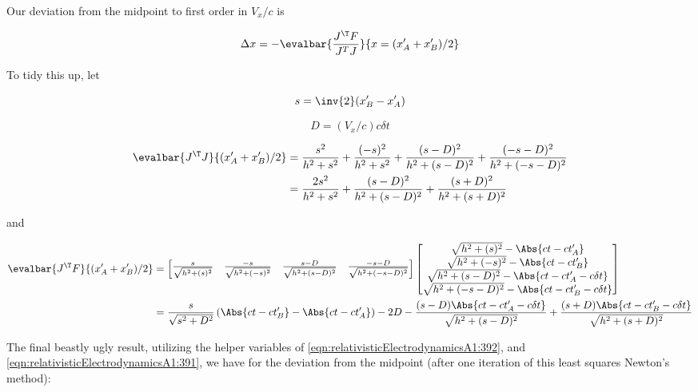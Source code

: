 Our deviation from the midpoint to first order in $V_x/c$ is

\begin{equation}\label{eqn:relativisticElectrodynamicsA1:390}
\Delta x = - \evalbar{ \frac{J^\T F}{J^T J} }{x = (x_A' + x_B')/2}
\end{equation}

To tidy this up, let

\begin{equation}\label{eqn:relativisticElectrodynamicsA1:391}
s = \inv{2} (x_B' - x_A')
\end{equation}

\begin{equation}\label{eqn:relativisticElectrodynamicsA1:392}
D = (V_x/c) c \delta t
\end{equation}

\begin{align*}
\evalbar{J^\T J}{(x_A' + x_B')/2} 
&= 
\frac{s^2}{h^2 + s^2}
+\frac{(-s)^2}{h^2 + s^2}
+\frac{(s - D)^2}{h^2 + (s -D)^2}
+\frac{(-s - D)^2}{h^2 + (-s -D)^2} \\
&= 
\frac{2 s^2}{h^2 + s^2}
+\frac{(s - D)^2}{h^2 + (s -D)^2}
+\frac{(s + D)^2}{h^2 + (s +D)^2}
\end{align*}

and

\begin{align*}
\evalbar{J^\T F}{(x_A' + x_B')/2} 
&=
\begin{bmatrix}
\frac{s}{\sqrt{ h^2 + (s)^2 } } &
\frac{-s}{\sqrt{ h^2 + (-s)^2 } } &
\frac{s - D}{\sqrt{ h^2 + (s - D)^2 } } &
\frac{-s - D}{\sqrt{ h^2 + (-s - D)^2 } } 
\end{bmatrix}
\begin{bmatrix}
\sqrt{ h^2 + (s)^2 } - \Abs{c t - c t_A'} \\
\sqrt{ h^2 + (-s)^2 } - \Abs{c t - c t_B'} \\
\sqrt{ h^2 + (s - D)^2 } - \Abs{c t - c t_A' - c \delta t} \\
\sqrt{ h^2 + (-s - D)^2 } - \Abs{c t - c t_B' - c \delta t} \\
\end{bmatrix} \\
&=
\frac{s}{\sqrt{s^2 + D^2}} \left( \Abs{ ct - c t_B' } - \Abs{ c t - c t_A'} \right) -2 D
- \frac{(s - D)\Abs{c t - c t_A' - c \delta t} }{ \sqrt{ h^2 + (s - D)^2 } } 
+ \frac{(s + D)\Abs{c t - c t_B' - c \delta t} }{ \sqrt{ h^2 + (s + D)^2 } } 
\end{align*}

The final beastly ugly result, utilizing the helper variables of \ref{eqn:relativisticElectrodynamicsA1:392}, and \ref{eqn:relativisticElectrodynamicsA1:391}, we have for the deviation from the midpoint (after one iteration of this least squares Newton's method):

